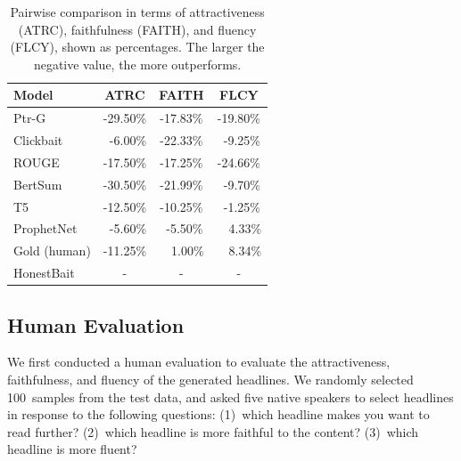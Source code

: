 \begin{table}[!h]
\centering
\small
\begin{tabular}{lccc}
\bottomrule
Model  & ATRC & FAITH & FLCY \\ \hline
Ptr-G           & -29.50\%        & -17.83\%         & -19.80\%        \\
Clickbait       & ~-6.00\%        & -22.33\%         & ~-9.25\%         \\
ROUGE & -17.50\%        & -17.25\%         & -24.66\%        \\
BertSum         & -30.50\%        & -21.99\%         & ~-9.70\%         \\
T5              & -12.50\%        & -10.25\%         & ~-1.25\%         \\
ProphetNet      & ~-5.60\%        & ~-5.50\%         & ~~4.33\%          \\
Gold (human)            & -11.25\%        & ~~1.00\%         & ~~8.34\%         \\ 
\hline
HonestBait      & -             & -              & -             \\ \toprule
\end{tabular}
\caption{\label{human-eval} Pairwise comparison in terms of
attractiveness (ATRC), faithfulness (FAITH), and fluency (FLCY), shown as
percentages. The larger the negative value, the more \modelname outperforms.}
\end{table}

\subsection{Human Evaluation}
\label{sec5_4}
We first conducted a human evaluation to evaluate the attractiveness,
faithfulness, and fluency of the generated headlines. 
We randomly selected 100~samples from the \dataset test data, and asked five native speakers to select
headlines in response to the following questions: 
(1)~which headline makes you want to read further? 
(2)~which headline is more faithful to the content?
(3)~which headline is more fluent?


